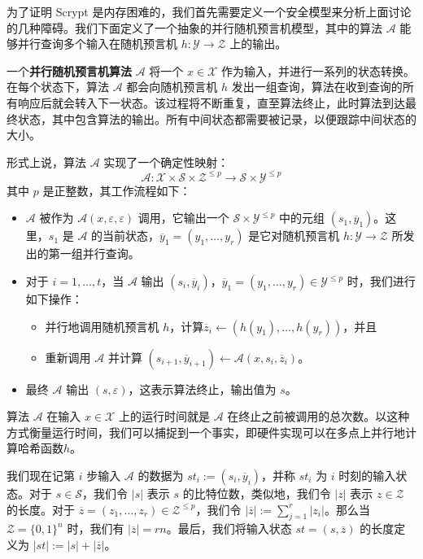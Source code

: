 \begin{snote}
为了证明 Scrypt 是内存困难的，我们首先需要定义一个安全模型来分析上面讨论的几种障碍。我们下面定义了一个抽象的并行随机预言机模型，其中的算法 $\mathcal{A}$ 能够并行查询多个输入在随机预言机 $h:\mathcal{Y}\to\mathcal{Z}$ 上的输出。

一个\textbf{并行随机预言机算法} $\mathcal{A}$ 将一个 $x\in\mathcal{X}$ 作为输入，并进行一系列的状态转换。在每个状态下，算法 $\mathcal{A}$ 都会向随机预言机 $h$ 发出一组查询，算法在收到查询的所有响应后就会转入下一状态。该过程将不断重复，直至算法终止，此时算法到达最终状态，其中包含算法的输出。所有中间状态都需要被记录，以便跟踪中间状态的大小。

形式上说，算法 $\mathcal{A}$ 实现了一个确定性映射：
\[
\mathcal{A}:\mathcal{X}\times\mathcal{S}\times\mathcal{Z}^{\leq p}\to\mathcal{S}\times\mathcal{Y}^{\leq p}
\]
其中 $p$ 是正整数，其工作流程如下：
\begin{itemize}
	\item $\mathcal{A}$ 被作为 $\mathcal{A}(x,\varepsilon,\varepsilon)$ 调用，它输出一个 $\mathcal{S}\times\mathcal{Y}^{\leq p}$ 中的元组 $(s_1,\overline y_1)$。这里，$s_1$ 是 $\mathcal{A}$ 的当前状态，$\overline y_1=(y_1,\dots,y_r)$ 是它对随机预言机 $h:\mathcal{Y}\to\mathcal{Z}$ 所发出的第一组并行查询。
	\item 对于 $i=1,\dots,t$，当 $\mathcal{A}$ 输出 $(s_i,\overline y_i)$，$\overline y_1=(y_1,\dots,y_r)\in\mathcal{Y}^{\leq p}$ 时，我们进行如下操作：
	\begin{itemize}
	  \item 并行地调用随机预言机 $h$，计算$\overline z_i\leftarrow (h(y_1),\dots,h(y_r))$，并且
	  \item 重新调用 $\mathcal{A}$ 并计算 $(s_{i+1},\overline y_{i+1})\leftarrow \mathcal{A}(x,s_i,\overline z_i)$。
	\end{itemize}
	\item 最终 $\mathcal{A}$ 输出 $(s,\varepsilon)$，这表示算法终止，输出值为 $s$。
\end{itemize}

算法 $\mathcal{A}$ 在输入 $x\in\mathcal{X}$ 上的运行时间就是 $\mathcal{A}$ 在终止之前被调用的总次数。以这种方式衡量运行时间，我们可以捕捉到一个事实，即硬件实现可以在多点上并行地计算哈希函数$h$。

我们现在记第 $i$ 步输入 $\mathcal{A}$ 的数据为 $st_i:=(s_i,\overline y_i)$，并称 $st_i$ 为 $i$ 时刻的输入状态。对于 $s\in\mathcal{S}$，我们令 $|s|$ 表示 $s$ 的比特位数，类似地，我们令 $|z|$ 表示 $z\in\mathcal{Z}$ 的长度。对于 $\overline z=(z_1,\dots,z_r)\in\mathcal{Z}^{\leq p}$，我们令 $|\overline z|:=\sum_{j=1}^r|z_i|$。那么当 $\mathcal{Z}=\{0,1\}^n$ 时，我们有 $|\overline z|=rn$。最后，我们将输入状态 $st=(s,\overline z)$ 的长度定义为 $|st|:=|s|+|\overline z|$。
\end{snote}

